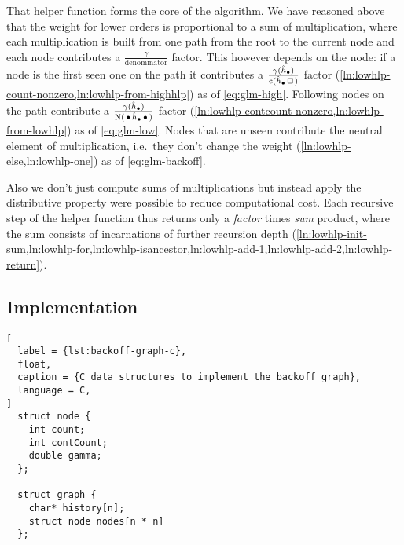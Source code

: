That helper function  forms the core of the algorithm.
We have reasoned above that the weight for lower orders is proportional to
a sum of multiplication, where each multiplication is built from one path
from the root to the current node and each node contributes a
$\frac{\gamma}{\text{denominator}}$ factor.
This however depends on the node: if a node is the first seen one on the path
it contributes a
$\frac{\gamma(\DerivedHistory[\DummyIndex])}{\Count(\DerivedHistory[\DummyIndex] \Skp)}$
factor (\cref{ln:lowhlp-count-nonzero,ln:lowhlp-from-highhlp}) as of
\cref{eq:glm-high}. Following nodes on the path contribute a
$\frac{\gamma(\DerivedHistory[\DummyIndex])}{\ContCount(\WSkp \DerivedHistory[\DummyIndex] \WSkp)}$
factor (\cref{ln:lowhlp-contcount-nonzero,ln:lowhlp-from-lowhlp}) as of
\cref{eq:glm-low}.
Nodes that are unseen contribute the neutral element of multiplication, i.e.\
they don't change the weight (\cref{ln:lowhlp-else,ln:lowhlp-one}) as of
\cref{eq:glm-backoff}.

Also we don't just compute sums of multiplications but instead apply
the distributive property were possible to reduce computational cost.
Each recursive step of the helper function thus returns only a \emph{factor}
times \emph{sum} product, where the sum consists of incarnations of further
recursion depth
(\cref{ln:lowhlp-init-sum,ln:lowhlp-for,ln:lowhlp-isancestor,ln:lowhlp-add-1,ln:lowhlp-add-2,ln:lowhlp-return}).

\subsection{Implementation}
\label{subsec:weightedsum-glm-implementation}


\begin{lstlisting}[
  label = {lst:backoff-graph-c},
  float,
  caption = {C data structures to implement the backoff graph},
  language = C,
]
  struct node {
    int count;
    int contCount;
    double gamma;
  };

  struct graph {
    char* history[n];
    struct node nodes[n * n]
  };
\end{lstlisting}

